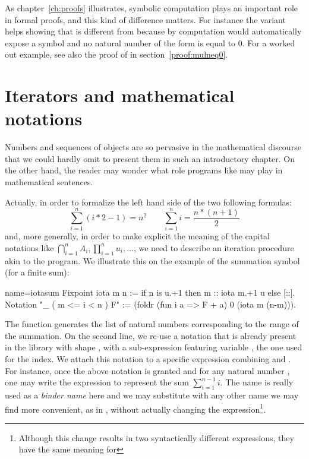 As chapter~\ref{ch:proofs} illustrates, symbolic computation plays an
important role in formal proofs, and this kind of difference
matters. For instance the  variant helps
showing that  is different from  because by
computation \Coq{} would automatically expose  a  symbol
and no natural number of the form  is equal to 0.
For a worked out example, see also the proof of  in
section~\ref{proof:mulneq0}.


\section{Iterators and mathematical notations}
\label{sec:bigopnat}

Numbers and sequences of objects are so pervasive in the mathematical
discourse that we could hardly omit to present them in such an
introductory chapter. On the other hand, the reader may wonder what role
programs like  may play in mathematical sentences.

Actually, in order to formalize the left hand side of the two
following formulas:
$$
\sum_{i=1}^n (i * 2 - 1) = n ^ 2 \qquad
\sum_{i=1}^n i = \frac{n * (n + 1)}{2}
$$
and, more generally, in order to make explicit the meaning of the capital
notations like $\bigcap_{i=1}^nA_i,
\prod_{i=1}^nu_i, \dots$, we need to describe an iteration procedure
akin to the  program. We illustrate this on the example of
the summation symbol (for a finite sum):

\begin{coq}{name=iotasum}{}
Fixpoint iota m n := if n is u.+1 then m :: iota m.+1 u else [::].
Notation "\sum_ ( m <= i < n ) F" :=
  (foldr (fun i a => F + a) 0 (iota m (n-m))).
\end{coq}
\index[coq]{\C{\\sum}}

The  function generates the list
\C{[:: m; m+1; ...; m+n-1]}
of natural numbers
corresponding to the range of the summation.
On the second line, we re-use a notation that is already present in
the library with shape , with  a
sub-expression featuring variable , the one used for the
index.   We attach this notation to a specific expression combining
 and .
For instance, once the above notation is granted and for any
natural number , one may write
the \Coq{} expression  to represent the
sum $\sum\limits_{i=1}^{n-1} i$. The name  is really used as a
\emph{binder name} here and we may substitute  with any other
name we may find more convenient, as in ,
without actually changing the expression\footnote{Although this change
results in two syntactically different expressions, they have the same
meaning for \Coq{}}.

